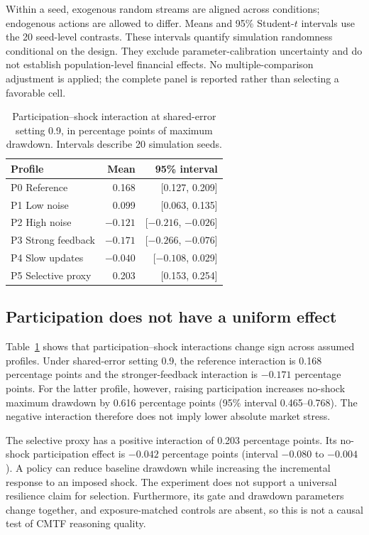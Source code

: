 Within a seed, exogenous random streams are aligned across conditions; endogenous actions are allowed to differ. Means and 95\% Student-$t$ intervals use the 20 seed-level contrasts. These intervals quantify simulation randomness conditional on the design. They exclude parameter-calibration uncertainty and do not establish population-level financial effects. No multiple-comparison adjustment is applied; the complete panel is reported rather than selecting a favorable cell.

\begin{table}[t]
\centering
\caption{Participation--shock interaction at shared-error setting 0.9, in percentage points of maximum drawdown. Intervals describe 20 simulation seeds.}
\begin{tabular}{lrr}
\toprule
Profile & Mean & 95\% interval\\\midrule
P0 Reference & 0.168 & [0.127, 0.209]\\
P1 Low noise & 0.099 & [0.063, 0.135]\\
P2 High noise & $-0.121$ & [$-0.216$, $-0.026$]\\
P3 Strong feedback & $-0.171$ & [$-0.266$, $-0.076$]\\
P4 Slow updates & $-0.040$ & [$-0.108$, 0.029]\\
P5 Selective proxy & 0.203 & [0.153, 0.254]\\
\bottomrule
\end{tabular}\label{tab:interactions}
\end{table}

\subsection{Participation does not have a uniform effect}
Table~\ref{tab:interactions} shows that participation--shock interactions change sign across assumed profiles. Under shared-error setting 0.9, the reference interaction is 0.168 percentage points and the stronger-feedback interaction is $-0.171$ percentage points. For the latter profile, however, raising participation increases no-shock maximum drawdown by 0.616 percentage points (95\% interval 0.465--0.768). The negative interaction therefore does not imply lower absolute market stress.

The selective proxy has a positive interaction of 0.203 percentage points. Its no-shock participation effect is $-0.042$ percentage points (interval $-0.080$ to $-0.004$). A policy can reduce baseline drawdown while increasing the incremental response to an imposed shock. The experiment does not support a universal resilience claim for selection. Furthermore, its gate and drawdown parameters change together, and exposure-matched controls are absent, so this is not a causal test of CMTF reasoning quality.

